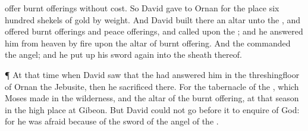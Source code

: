 {offer burnt
offerings without
cost.
So
David
gave to
Ornan for the
place
six
hundred
shekels of
gold by
weight.
And
David
built there an
altar unto the
{}, and
offered burnt
offerings and peace
offerings, and
called upon the
{}; and he
answered him from
heaven by
fire upon the
altar of burnt
offering.
And the
{}
commanded the
angel; and he put
up his
sword
again into the
sheath thereof.
\par }{\PP {}¶ At that
time when
David
saw that the
{} had
answered him in the
threshingfloor of
Ornan the
Jebusite, then he
sacrificed there.
For the
tabernacle of the
{}, which
Moses
made in the
wilderness, and the
altar of the burnt
offering,
{} at that
season in the high
place at
Gibeon.
But
David
could not
go
before it to
enquire of
God: for he was
afraid
because of the
sword of the
angel of the
{}.

}
